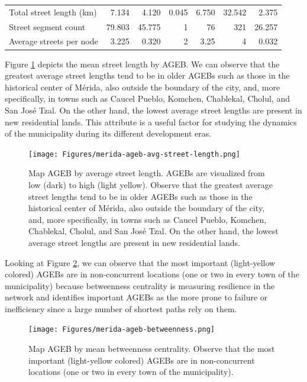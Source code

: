 \begin{landscape}
\begin{table}[htbp]
\begin{tabular}{ l r r r r r r }
    Total street length (km)                         & 7.134           & 4.120           & 0.045            & 6.750           & 32.542          & 2.375      \\
    Street segment count                             & 79.803          & 45.775          & 1           & 76           & 321         & 26.257      \\
    Average streets per node                         & 3.225          & 0.320          & 2          & 3.25          & 4          & 0.032          \\
    \bottomrule
  \end{tabular}
\end{table}
\end{landscape}

Figure \ref{fig:merida-ageb-avg-street-length} depicts the mean street length by AGEB. We can observe that the greatest average street lengths tend to be in older AGEBs such as those in the historical center of Mérida, also outside the boundary of the city, and, more specifically, in towns such as Caucel Pueblo, Komchen, Chablekal, Cholul, and San José Tzal. On the other hand, the lowest average street lengths are present in new residential lands. This attribute is a useful factor for studying the dynamics of the municipality during its different development eras.

\begin{figure}[htpb]
  \centering
  \texttt{[image: Figures/merida-ageb-avg-street-length.png]}
  \caption{Map AGEB by average street length. AGEBs are visualized from low (dark) to high (light yellow). Observe that the greatest average street lengths tend to be in older AGEBs such as those in the historical center of Mérida, also outside the boundary of the city, and, more specifically, in towns such as Caucel Pueblo, Komchen, Chablekal, Cholul, and San José Tzal. On the other hand, the lowest average street lengths are present in new residential lands.
    \label{fig:merida-ageb-avg-street-length}}
\end{figure}

Looking at Figure \ref{fig:merida-ageb-betweenness}, we can observe that the most important (light-yellow colored) AGEBs are in non-concurrent locations (one or two in every town of the municipality) because betweenness centrality is measuring resilience in the network and identifies important AGEBs as the more prone to failure or inefficiency since a large number of shortest paths rely on them.

\begin{figure}[htpb]
  \centering
  \texttt{[image: Figures/merida-ageb-betweenness.png]}
  \caption{Map AGEB by mean betweenness centrality. Observe that the most important (light-yellow colored) AGEBs are in non-concurrent locations (one or two in every town of the municipality).
    \label{fig:merida-ageb-betweenness}}
\end{figure}

